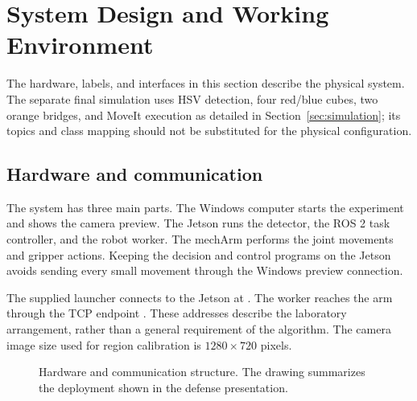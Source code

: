 \section{System Design and Working Environment}
The hardware, labels, and interfaces in this section describe the physical system. The separate final simulation uses HSV detection, four red/blue cubes, two orange bridges, and MoveIt execution as detailed in Section~\ref{sec:simulation}; its topics and class mapping should not be substituted for the physical configuration.

\subsection{Hardware and communication}
The system has three main parts. The Windows computer starts the experiment and shows the camera preview. The Jetson runs the detector, the ROS 2 task controller, and the robot worker. The mechArm performs the joint movements and gripper actions. Keeping the decision and control programs on the Jetson avoids sending every small movement through the Windows preview connection.

The supplied launcher connects to the Jetson at . The worker reaches the arm through the TCP endpoint . These addresses describe the laboratory arrangement, rather than a general requirement of the algorithm. The camera image size used for region calibration is $1280\times720$ pixels.

\begin{figure}[H]\centering
{}
\caption{Hardware and communication structure. The drawing summarizes the deployment shown in the defense presentation.}
\label{fig:hardware}
\end{figure}

